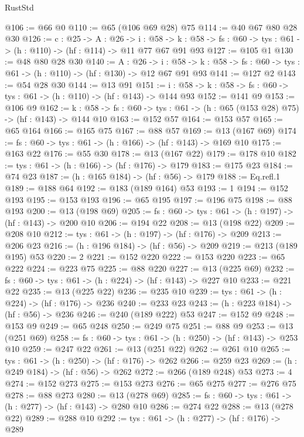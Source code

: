 \begin{lexlean}{RustStd}
\begin{coremodule}
@106 := @66 @0
@110 := @65 (@106 @69 @28) @75
@114 := @40 @67 @80 @28 @30
@126 := {c : @25} ->
  {A : @26} ->
  {i : @58} ->
  {k : @58} -> {fs : @60} -> {tys : @61} -> (h : @110) -> (hf : @114) -> @11 @77 @67 @91 @93
@127 := @105 @1
@130 := @48 @80 @28 @30
@140 := {A : @26} ->
  {i : @58} ->
  {k : @58} -> {fs : @60} -> {tys : @61} -> (h : @110) -> (hf : @130) -> @12 @67 @91 @93
@141 := @127 @2
@143 := @54 @28 @30
@144 := @13 @91
@151 := {i : @58} -> {k : @58} -> {fs : @60} -> {tys : @61} -> (h : @110) -> (hf : @143) -> @144 @93
@152 := @141 @9
@153 := @106 @9
@162 := {k : @58} ->
  {fs : @60} -> {tys : @61} -> (h : @65 (@153 @28) @75) -> (hf : @143) -> @144 @10
@163 := @152 @57
@164 := @153 @57
@165 := @65 @164
@166 := @165 @75
@167 := @88 @57
@169 := @13 (@167 @69)
@174 := {fs : @60} -> {tys : @61} -> (h : @166) -> (hf : @143) -> @169 @10
@175 := @163 @22
@176 := @55 @30
@178 := @13 (@167 @22)
@179 := @178 @10
@182 := {tys : @61} -> (h : @166) -> (hf : @176) -> @179
@183 := @175 @23
@184 := @74 @23
@187 := (h : @165 @184) -> (hf : @56) -> @179
@188 := Eq.refl.{1}
@189 := @188 @64
@192 := @183 (@189 @164) @53
@193 := 1
@194 := @152 @193
@195 := @153 @193
@196 := @65 @195
@197 := @196 @75
@198 := @88 @193
@200 := @13 (@198 @69)
@205 := {fs : @60} -> {tys : @61} -> (h : @197) -> (hf : @143) -> @200 @10
@206 := @194 @22
@208 := @13 (@198 @22)
@209 := @208 @10
@212 := {tys : @61} -> (h : @197) -> (hf : @176) -> @209
@213 := @206 @23
@216 := (h : @196 @184) -> (hf : @56) -> @209
@219 := @213 (@189 @195) @53
@220 := 2
@221 := @152 @220
@222 := @153 @220
@223 := @65 @222
@224 := @223 @75
@225 := @88 @220
@227 := @13 (@225 @69)
@232 := {fs : @60} -> {tys : @61} -> (h : @224) -> (hf : @143) -> @227 @10
@233 := @221 @22
@235 := @13 (@225 @22)
@236 := @235 @10
@239 := {tys : @61} -> (h : @224) -> (hf : @176) -> @236
@240 := @233 @23
@243 := (h : @223 @184) -> (hf : @56) -> @236
@246 := @240 (@189 @222) @53
@247 := @152 @9
@248 := @153 @9
@249 := @65 @248
@250 := @249 @75
@251 := @88 @9
@253 := @13 (@251 @69)
@258 := {fs : @60} -> {tys : @61} -> (h : @250) -> (hf : @143) -> @253 @10
@259 := @247 @22
@261 := @13 (@251 @22)
@262 := @261 @10
@265 := {tys : @61} -> (h : @250) -> (hf : @176) -> @262
@266 := @259 @23
@269 := (h : @249 @184) -> (hf : @56) -> @262
@272 := @266 (@189 @248) @53
@273 := 4
@274 := @152 @273
@275 := @153 @273
@276 := @65 @275
@277 := @276 @75
@278 := @88 @273
@280 := @13 (@278 @69)
@285 := {fs : @60} -> {tys : @61} -> (h : @277) -> (hf : @143) -> @280 @10
@286 := @274 @22
@288 := @13 (@278 @22)
@289 := @288 @10
@292 := {tys : @61} -> (h : @277) -> (hf : @176) -> @289

\end{coremodule}
\end{lexlean}
